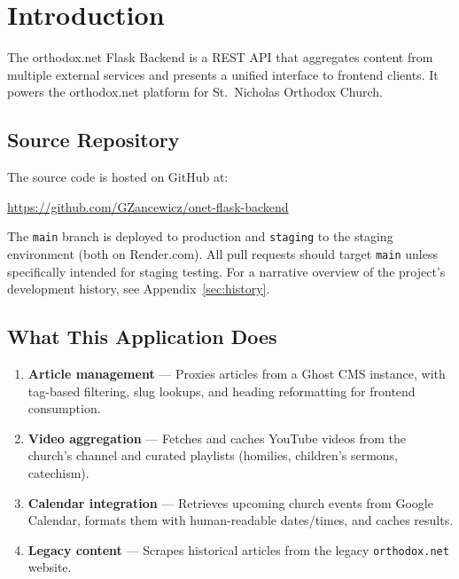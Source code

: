 \documentclass[12pt]{article}
\begin{document}
\clearpage
\section{Introduction}

The orthodox.net Flask Backend is a REST API that aggregates content from multiple external services and presents a unified interface to frontend clients. It powers the orthodox.net platform for St.\ Nicholas Orthodox Church.

\subsection{Source Repository}
The source code is hosted on GitHub at:

\begin{center}
\url{https://github.com/GZancewicz/onet-flask-backend}
\end{center}

\noindent The \texttt{main} branch is deployed to production and \texttt{staging} to the staging environment (both on Render.com). All pull requests should target \texttt{main} unless specifically intended for staging testing. For a narrative overview of the project's development history, see Appendix~\ref{sec:history}.

\subsection{What This Application Does}
\begin{enumerate}
    \item \textbf{Article management} --- Proxies articles from a Ghost CMS instance, with tag-based filtering, slug lookups, and heading reformatting for frontend consumption.
    \item \textbf{Video aggregation} --- Fetches and caches YouTube videos from the church's channel and curated playlists (homilies, children's sermons, catechism).
    \item \textbf{Calendar integration} --- Retrieves upcoming church events from Google Calendar, formats them with human-readable dates/times, and caches results.
    \item \textbf{Legacy content} --- Scrapes historical articles from the legacy \texttt{orthodox.net} website.
\end{enumerate}
\end{document}
